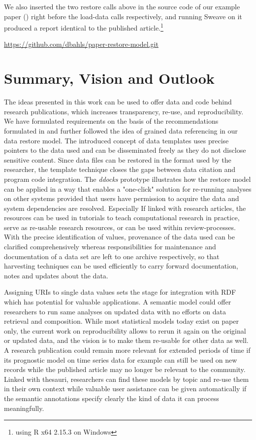 \documentclass{acm_proc_article-sp}
\begin{document}
We also inserted the two restore calls above in the source code of our example paper (\cite{koenkerzeileis09}) right before the load-data calls respectively, and running Sweave on it produced a report identical to the published article.\footnote{using R x64 2.15.3 on Windows}


%
%
\url{https://github.com/dbahls/paper-restore-model.git}


\section{Summary, Vision and Outlook}\label{sec:outlook}


The ideas presented in this work can be used to offer data and code behind research publications, which increases transparency, re-use, and reproducibility.
We have formulated requirements on the basis of the recommendations formulated in \cite{RePEc_ejw_journl_v_4_y_2007_i_3_p_326_337} and further followed the idea of grained data referencing in our data restore model.
The introduced concept of data templates uses precise pointers to the data used and can be disseminated freely as they do not disclose sensitive content.
Since data files can be restored in the format used by the researcher, the template technique closes the gaps between data citation and program code integration.
The \textit{ddocks} prototype illustrates how the restore model can be applied in a way that enables a "one-click" solution for re-running analyses on other systems provided that users have permission to acquire the data and system dependencies are resolved.
Especially If linked with research articles, the resources can be used in tutorials to teach computational research in practice, serve as re-usable research resources, or can be used within review-processes.
With the precise identification of values, provenance of the data used can be clarified comprehensively whereas responsibilities for maintenance and documentation of a data set are left to one archive respectively, so that harvesting techniques can be used efficiently to carry forward documentation, notes and updates about the data.



Assigning URIs to single data values sets the stage for integration with RDF which has potential for valuable applications.
A semantic model could offer researchers to run same analyses on updated data with no efforts on data retrieval and composition.
While most statistical models today exist on paper only, the current work on reproducibility allows to rerun it again on the original or updated data, and the vision is to make them re-usable for other data as well.
A research publication could remain more relevant for extended periods of time if its prognostic model on time series data for example can still be used on new records while the published article may no longer be relevant to the community.
Linked with thesauri, researchers can find these models by topic and re-use them in their own context while valuable user assistance can be given automatically if the semantic annotations specify clearly the kind of data it can process meaningfully.
\end{document}
